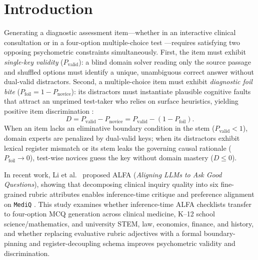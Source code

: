 \documentclass[11pt,a4paper]{article}
\begin{document}
\section{Introduction}
Generating a diagnostic assessment item---whether in an interactive clinical consultation \cite{li2024mediq,li2025alfa} or in a four-option multiple-choice test \cite{haladyna2002developing,lord1980applications,gierl2017developing,jin2021medqa}---requires satisfying two opposing psychometric constraints simultaneously. First, the item must exhibit \emph{single-key validity} ($P_{\text{valid}}$): a blind domain solver reading only the source passage and shuffled options must identify a unique, unambiguous correct answer without dual-valid distractors. Second, a multiple-choice item must exhibit \emph{diagnostic foil bite} ($P_{\text{foil}} = 1 - P_{\text{novice}}$): its distractors must instantiate plausible cognitive faults that attract an unprimed test-taker who relies on surface heuristics, yielding positive item discrimination \cite{lord1980applications}:
\begin{equation}
  D = P_{\text{valid}} - P_{\text{novice}} = P_{\text{valid}} - (1 - P_{\text{foil}}).
  \label{eq:discrimination}
\end{equation}
When an item lacks an eliminative boundary condition in the stem ($P_{\text{valid}} < 1$), domain experts are penalized by dual-valid keys; when its distractors exhibit lexical register mismatch or its stem leaks the governing causal rationale ($P_{\text{foil}} \to 0$), test-wise novices guess the key without domain mastery ($D \le 0$).

In recent work, Li et al.\ \cite{li2025alfa} proposed ALFA (\emph{Aligning LLMs to Ask Good Questions}), showing that decomposing clinical inquiry quality into six fine-grained rubric attributes enables inference-time critique and preference alignment \cite{rafailov2023dpo} on \texttt{MediQ} \cite{li2024mediq}. This study examines whether inference-time ALFA checklists transfer to four-option MCQ generation across clinical medicine, K--12 school science/mathematics, and university STEM, law, economics, finance, and history, and whether replacing evaluative rubric adjectives with a formal boundary-pinning and register-decoupling schema improves psychometric validity and discrimination.
\end{document}
